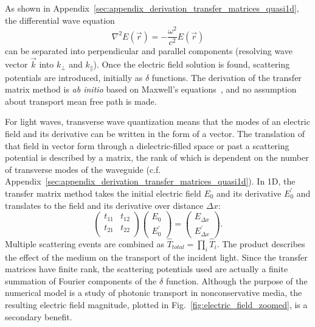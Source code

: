 As shown in Appendix~\ref{sec:appendix_derivation_transfer_matrices_quasi1d}, the differential wave equation
\begin{equation}
\nabla^2 E(\vec{r}) = - \frac{\omega^2}{c^2} E(\vec{r})
\label{eq:wave_equation_electric_field_introduction}
\end{equation}
can be separated into perpendicular and parallel components (resolving wave vector $\vec{k}$ into $k_{\perp}$ and $k_{\parallel}$). Once the electric field solution is found, scattering potentials are introduced, initially as $\delta$ functions. The derivation of the transfer matrix method is \textit{ab initio} based on Maxwell's equations~\cite{1999_Jackson}, and no assumption about transport mean free path is made. 

For light waves, transverse wave quantization means that the modes of an electric field and its derivative can be written in the 
form of a vector. The translation of that field in vector form through a dielectric-filled space or past a scattering potential is described by a matrix, the rank of which is dependent on the number of transverse modes of the waveguide (c.f. Appendix~\ref{sec:appendix_derivation_transfer_matrices_quasi1d}). In 1D, the transfer matrix method takes the initial electric field $E_0$ and its derivative $E_0^{\prime}$ and translates to the field and its derivative over distance $\Delta x$:
\begin{equation}
 \left( \begin{array}{cc}
t_{11} & t_{12} \\
t_{21} & t_{22} \\
\end{array} \right)
\left( \begin{array}{c}
E_0 \\
E_0^{\prime}
\end{array} \right)
=
\left( \begin{array}{c}
E_{\Delta x} \\
E_{\Delta x}^{\prime}
\end{array} \right).
\end{equation}
Multiple scattering events are combined as $\hat{T}_{total} = \prod_i \hat{T}_i$. The product describes the effect of the medium on the transport of the incident light. Since the transfer matrices have finite rank, the scattering potentials used are actually a finite summation of Fourier components of the $\delta$ function. Although the purpose of the numerical model is a study of photonic transport in nonconservative media, the resulting electric field magnitude, plotted in Fig.~\ref{fig:electric_field_zoomed}, is a secondary benefit.

